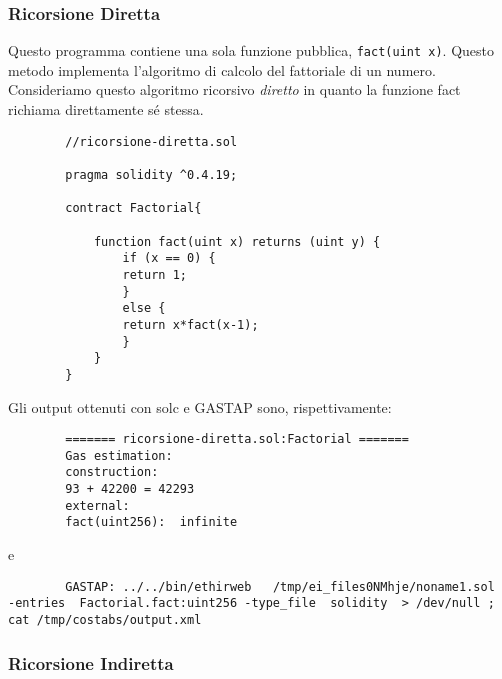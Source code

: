         \subsubsection{Ricorsione Diretta}
        
        Questo programma contiene una sola funzione pubblica, \verb|fact(uint x)|. Questo metodo implementa l'algoritmo di calcolo del fattoriale di un numero. Consideriamo questo algoritmo ricorsivo \emph{diretto} in quanto la funzione fact richiama direttamente sé stessa.\newline
        
        \begin{minipage}{\linewidth}
        \begin{lstlisting}
        //ricorsione-diretta.sol

        pragma solidity ^0.4.19;

        contract Factorial{

            function fact(uint x) returns (uint y) {
                if (x == 0) {
                return 1;
                }
                else {
                return x*fact(x-1);
                }
            }
        }
        \end{lstlisting}
        \end{minipage}
        
        Gli output ottenuti con solc e GASTAP sono, rispettivamente:
        
        \begin{minipage}{\linewidth}
        \begin{lstlisting}
        ======= ricorsione-diretta.sol:Factorial =======
        Gas estimation:
        construction:
        93 + 42200 = 42293
        external:
        fact(uint256):	infinite
        \end{lstlisting}
        \end{minipage}

        e
    
        \begin{lstlisting}
        GASTAP: ../../bin/ethirweb   /tmp/ei_files0NMhje/noname1.sol  -entries  Factorial.fact:uint256 -type_file  solidity  > /dev/null ; cat /tmp/costabs/output.xml         
        \end{lstlisting}


        \subsubsection{Ricorsione Indiretta}
        
